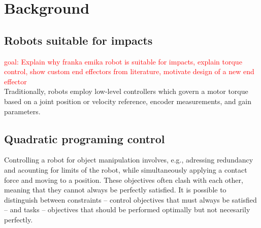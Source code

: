 \documentclass[a4paper, 10pt, conference]{ieeeconf}
\begin{document}
    \section{Background}
    \subsection{Robots suitable for impacts}
    \textcolor{red}{goal: Explain why franka emika robot is suitable for impacts, explain torque control, show custom end effectors from literature, motivate design of a new end effector}\\
    Traditionally, robots employ low-level controllers which govern a motor torque based on a joint position or velocity reference, encoder measurements, and gain parameters. 






    
    \subsection{Quadratic programing control} \label{sec:QP}
    Controlling a robot for object manipulation involves, e.g., adressing redundancy and acounting for limits of the robot, while simultaneously applying a contact force and moving to a position. These objectives often clash with each other, meaning that they cannot always be perfectly satisfied. It is possible to distinguish between constraints -- control objectives that must always be satisfied -- and tasks -- objectives that should be performed optimally but not necesarily perfectly.
\end{document}
